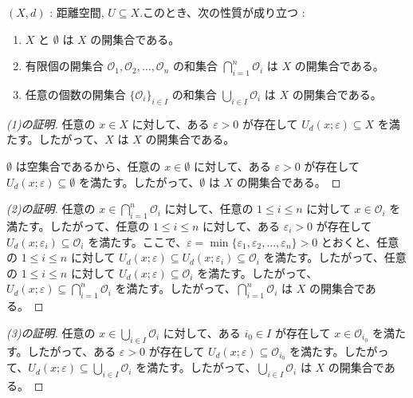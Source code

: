 \documentclass[article,paper=a4paper]{jlreq}
\begin{document}
\begin{thm}
    \quad $(X,d)$ : 距離空間, $U \subseteq X$.\quad このとき、次の性質が成り立つ : 
    \begin{enumerate}[label=(\arabic*)\,]
        \item $X$ と $\emptyset$ は $X$ の開集合である。
        \item 有限個の開集合 $\mathcal{O}_1, \mathcal{O}_2, \ldots, \mathcal{O}_n$ の和集合 $\bigcap_{i=1}^n \mathcal{O}_i$ は $X$ の開集合である。
        \item 任意の個数の開集合 $\{\mathcal{O}_i\}_{i \in I}$ の和集合 $\bigcup_{i \in I} \mathcal{O}_i$ は $X$ の開集合である。
    \end{enumerate}
\end{thm}

\begin{proof}[(1)の証明]
    任意の $x \in X$ に対して、ある $\varepsilon > 0$ が存在して $U_d(x;\varepsilon) \subseteq X$ を満たす。したがって、$X$ は $X$ の開集合である。

    $\emptyset$ は空集合であるから、任意の $x \in \emptyset$ に対して、ある $\varepsilon > 0$ が存在して $U_d(x;\varepsilon) \subseteq \emptyset$ を満たす。したがって、$\emptyset$ は $X$ の開集合である。
\end{proof}

\begin{proof}[(2)の証明]
    任意の $x \in \bigcap_{i=1}^n \mathcal{O}_i$ に対して、任意の $1 \leq i \leq n$ に対して $x \in \mathcal{O}_i$ を満たす。したがって、任意の $1 \leq i \leq n$ に対して、ある $\varepsilon_i > 0$ が存在して $U_d(x;\varepsilon_i) \subseteq \mathcal{O}_i$ を満たす。ここで、$\varepsilon = \min\{\varepsilon_1, \varepsilon_2, \ldots, \varepsilon_n\} > 0$ とおくと、任意の $1 \leq i \leq n$ に対して $U_d(x;\varepsilon) \subseteq U_d(x;\varepsilon_i) \subseteq \mathcal{O}_i$ を満たす。したがって、任意の $1 \leq i \leq n$ に対して $U_d(x;\varepsilon) \subseteq \mathcal{O}_i$ を満たす。したがって、$U_d(x;\varepsilon) \subseteq \bigcap_{i=1}^n \mathcal{O}_i$ を満たす。したがって、$\bigcap_{i=1}^n \mathcal{O}_i$ は $X$ の開集合である。
\end{proof}

\begin{proof}[(3)の証明]
    任意の $x \in \bigcup_{i \in I} \mathcal{O}_i$ に対して、ある $i_0 \in I$ が存在して $x \in \mathcal{O}_{i_0}$ を満たす。したがって、ある $\varepsilon > 0$ が存在して $U_d(x;\varepsilon) \subseteq \mathcal{O}_{i_0}$ を満たす。したがって、$U_d(x;\varepsilon) \subseteq \bigcup_{i \in I} \mathcal{O}_i$ を満たす。したがって、$\bigcup_{i \in I} \mathcal{O}_i$ は $X$ の開集合である。
\end{proof}
\end{document}
